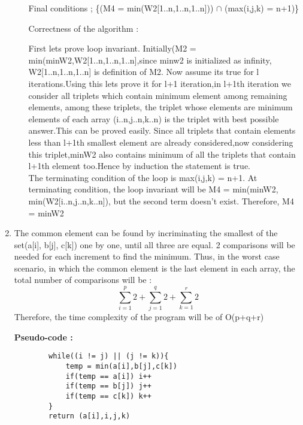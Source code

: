 \documentclass[12pt]{article}
\begin{document}
\begin{enumerate}
\begin{enumerate}
        Final conditions ; \{(M4 = min(W2[1..n,1..n,1..n])) $\cap$ (max(i,j,k) = n+1)\}
        
        Correctness of the algorithm : 
        
        First lets prove loop invariant.
        Initially(M2 = min(minW2,W2[1..n,1..n,1..n],since minw2 is initialized as infinity, W2[1..n,1..n,1..n] is definition of M2.
        Now assume its true for l iterations.Using this lets prove it for l+1 iteration,in l+1th iteration we consider all triplets which contain minimum element among remaining elements, among these triplets, the triplet whose elements are minimum elements of each array (i..n,j..n,k..n) is the triplet with best possible answer.This can be proved easily.
        Since all triplets that contain elements less than l+1th smallest element are already considered,now considering this triplet,minW2 also contains minimum of all the triplets that contain l+1th element too.Hence by induction the statement is true.
        \\The terminating condition of the loop is max(i,j,k) = n+1. At terminating condition, the loop invariant will be M4 = min(minW2, min(W2[i..n,j..n,k..n]), but the second term doesn't exist. Therefore, M4 = minW2
    \end{enumerate}
    \item
    The common element can be found by incriminating the smallest of the set(a[i], b[j], c[k]) one by one, until all three are equal. 2 comparisons will be needed for each increment to find the minimum. Thus, in the worst case scenario, in which the common element is the last element in each array, the total number of comparisons will be :
    \[ \sum_{i=1}^{p}2 +  \sum_{j=1}^{q}2 + \sum_{k=1}^{r}2\]
    Therefore, the time complexity of the program will be of O(p+q+r)
    
    \textbf{Pseudo-code :}
    \begin{verbatim}
        while((i != j) || (j != k)){
            temp = min(a[i],b[j],c[k])
            if(temp == a[i]) i++
            if(temp == b[j]) j++
            if(temp == c[k]) k++
        }
        return (a[i],i,j,k)
    \end{verbatim}
    

\end{enumerate}
\end{document}
